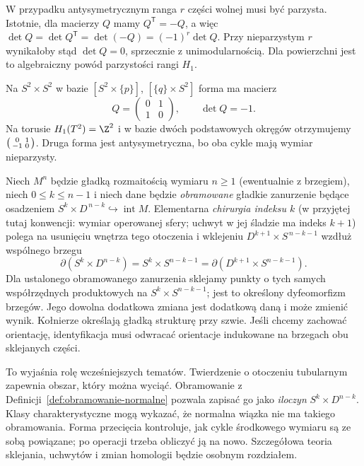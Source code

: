 W przypadku antysymetrycznym ranga $r$ części wolnej
musi być parzysta. Istotnie, dla macierzy $Q$ mamy
$Q^{\mathsf T}=-Q$, a więc
$\det Q=\det Q^{\mathsf T}=\det(-Q)=(-1)^r\det Q$.
Przy nieparzystym $r$ wynikałoby stąd $\det Q=0$,
sprzecznie z unimodularnością. Dla powierzchni
jest to algebraiczny powód parzystości rangi $H_1$.

\begin{przyklad}
Na $S^2\times S^2$
w bazie
$[S^2\times\{p\}]$,
$[\{q\}\times S^2]$
forma ma macierz
\[
 Q=
 \begin{pmatrix}
  0&1\\1&0
 \end{pmatrix},
 \qquad\det Q=-1.
\]
Na torusie
$H_1(T^2)=\Z^2$
i w bazie dwóch
podstawowych okręgów
otrzymujemy
$\begin{psmallmatrix}
0&1\\-1&0
\end{psmallmatrix}$.
Druga forma jest
antysymetryczna,
bo oba cykle mają
wymiar nieparzysty.
\end{przyklad}

\begin{definicja}
\label{def:chirurgia-zarys-16}
Niech $M^n$ będzie gładką rozmaitością
wymiaru $n\geq1$ (ewentualnie z brzegiem),
niech $0\leq k\leq n-1$ i niech dane będzie
\emph{obramowane} gładkie zanurzenie będące
osadzeniem
$S^k\times D^{\,n-k}
\hookrightarrow\operatorname{int}M$.
Elementarna
\emph{chirurgia indeksu $k$} (w przyjętej tutaj
konwencji: wymiar operowanej sfery; uchwyt w jej
śladzie ma indeks $k+1$) polega na usunięciu
wnętrza tego
otoczenia i
wklejeniu
$D^{k+1}\times
S^{\,n-k-1}$
wzdłuż wspólnego brzegu
\[
 \partial(S^k\times D^{n-k})
 =S^k\times S^{n-k-1}
 =\partial(D^{k+1}\times S^{n-k-1}).
\]
Dla ustalonego obramowanego zanurzenia sklejamy
punkty o tych samych współrzędnych produktowych na
$S^k\times S^{n-k-1}$; jest to określony dyfeomorfizm
brzegów. Jego dowolna dodatkowa zmiana jest dodatkową
daną i może zmienić wynik. Kołnierze określają gładką
strukturę przy szwie. Jeśli chcemy zachować orientację,
identyfikacja musi odwracać orientacje indukowane
na brzegach obu sklejanych części.
\end{definicja}

To wyjaśnia rolę
wcześniejszych tematów.
Twierdzenie o otoczeniu
tubularnym zapewnia
obszar, który można
wyciąć. Obramowanie
z Definicji~\ref{def:obramowanie-normalne}
pozwala zapisać go
jako \emph{iloczyn}
$S^k\times D^{n-k}$.
Klasy charakterystyczne
mogą wykazać, że
normalna wiązka
nie ma takiego
obramowania.
Forma przecięcia
kontroluje, jak
cykle środkowego
wymiaru są ze sobą
powiązane; po
operacji trzeba
obliczyć ją na nowo.
Szczegółowa teoria
sklejania, uchwytów
i zmian homologii
będzie osobnym
rozdziałem.

